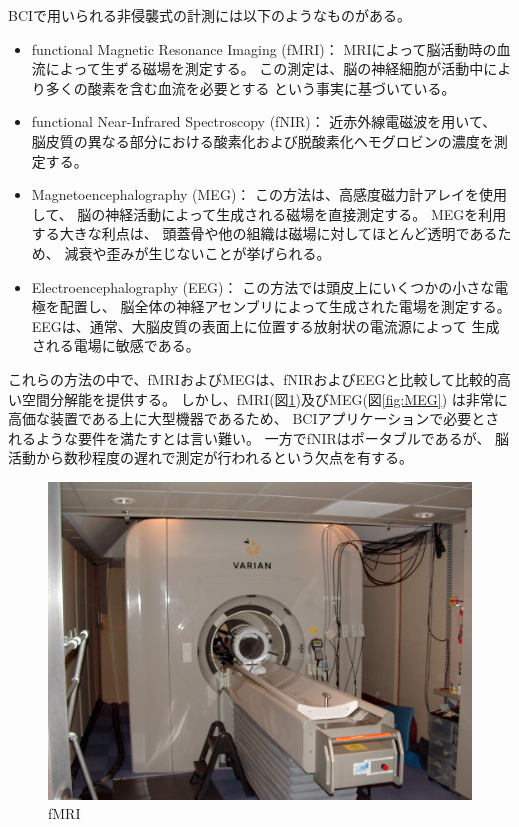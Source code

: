 BCIで用いられる非侵襲式の計測には以下のようなものがある。
\begin{itemize}
    \item functional Magnetic Resonance Imaging (fMRI)：
    MRIによって脳活動時の血流によって生ずる磁場を測定する。
    この測定は、脳の神経細胞が活動中により多くの酸素を含む血流を必要とする
    という事実に基づいている。
    \item functional Near-Infrared Spectroscopy (fNIR)：
    近赤外線電磁波を用いて、
    脳皮質の異なる部分における酸素化および脱酸素化ヘモグロビンの濃度を測定する。
    \item Magnetoencephalography (MEG)：
    この方法は、高感度磁力計アレイを使用して、
    脳の神経活動によって生成される磁場を直接測定する。
    MEGを利用する大きな利点は、
    頭蓋骨や他の組織は磁場に対してほとんど透明であるため、
    減衰や歪みが生じないことが挙げられる。
    \item Electroencephalography (EEG)：
    この方法では頭皮上にいくつかの小さな電極を配置し、
    脳全体の神経アセンブリによって生成された電場を測定する。
    EEGは、通常、大脳皮質の表面上に位置する放射状の電流源によって
    生成される電場に敏感である。
\end{itemize}
これらの方法の中で、fMRIおよびMEGは、fNIRおよびEEGと比較して比較的高い空間分解能を提供する\cite{脳を測る}。
しかし、fMRI(図\ref{fig:fMRI})及びMEG(図\ref{fig:MEG})
は非常に高価な装置である上に大型機器であるため、
BCIアプリケーションで必要とされるような要件を満たすとは言い難い。
一方でfNIRはポータブルであるが、
脳活動から数秒程度の遅れで測定が行われるという欠点を有する\cite{脳を測る}。
\begin{figure}
    \begin{center}
    \includegraphics[width=120mm]{images/fMRI.jpg}
    \end{center}
    \caption{fMRI}
    \label{fig:fMRI}
\end{figure}
